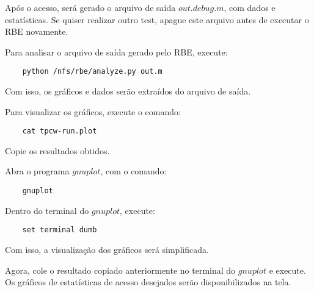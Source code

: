 \documentclass{article}
\begin{document}
    Após o acesso, será gerado o arquivo de saída $out.debug.m$, com dados e estatísticas. Se quiser realizar outro test, apague este arquivo antes de executar o RBE novamente.

    Para analisar o arquivo de saída gerado pelo RBE, execute:
\begin{verbatim}
    python /nfs/rbe/analyze.py out.m
\end{verbatim}

Com isso, os gráficos e dados serão extraídos do arquivo de saída.

Para visualizar os gráficos, execute o comando:

\begin{verbatim}
    cat tpcw-run.plot
\end{verbatim}

Copie os resultados obtidos.

Abra o programa $gnuplot$, com o comando:

\begin{verbatim}
    gnuplot
\end{verbatim}

Dentro do terminal do $gnuplot$, execute:

\begin{verbatim}
    set terminal dumb
\end{verbatim}

Com isso, a visualização dos gráficos será simplificada.

Agora, cole o resultado copiado anteriormente no terminal do $gnuplot$ e execute. Os gráficos de estatísticas de acesso desejados serão disponibilizados na tela.
\end{document}
